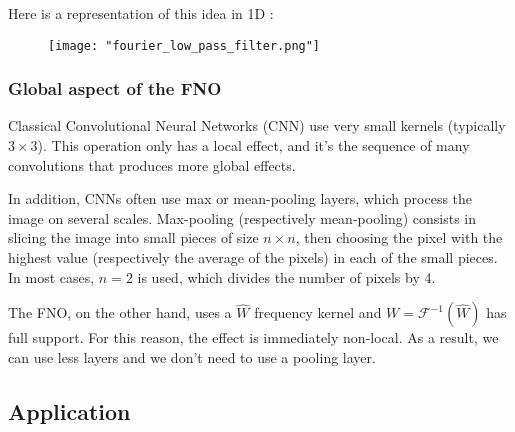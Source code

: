Here is a representation of this idea in 1D :

\begin{figure}[H]
	\centering
	\texttt{[image: "fourier\_low\_pass\_filter.png"]}
\end{figure}

\subsubsection{Global aspect of the FNO}

Classical Convolutional Neural Networks (CNN) use very small kernels (typically $3\times 3$). This operation only has a local effect, and it's the sequence of many convolutions that produces more global effects. 

In addition, CNNs often use max or mean-pooling layers, which process the image on several scales. Max-pooling (respectively mean-pooling) consists in slicing the image into small pieces of size $n\times n$, then choosing the pixel with the highest value (respectively the average of the pixels) in each of the small pieces. In most cases, $n=2$ is used, which divides the number of pixels by 4.

The FNO, on the other hand, uses a $\hat{W}$ frequency kernel and $W=\mathcal{F}^{-1}(\hat{W})$ has full support. For this reason, the effect is immediately non-local. As a result, we can use less layers and we don't need to use a pooling layer.
\subsection{Application}


